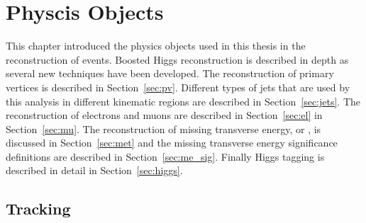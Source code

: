 \chapter{Physcis Objects}

\label{ch:objects}
This chapter introduced the physics objects used in this thesis in the reconstruction of events. 
Boosted Higgs reconstruction is described in depth as several new techniques have been developed.
 The reconstruction of primary vertices is described in Section~\ref{sec:pv}. 
Different types of jets that are used by this analysis in different kinematic regions are described in Section~\ref{sec:jets}. 
The reconstruction of electrons and muons are described in Section~\ref{sec:el} in Section~\ref{sec:mu}. 
The reconstruction of missing transverse energy, or \met, is discussed in Section~\ref{sec:met} 
and the missing transverse energy significance definitions are described in Section~\ref{sec:me_sig}. 
Finally Higgs tagging is described in detail in Section~\ref{sec:higgs}. 

\section{Tracking}

